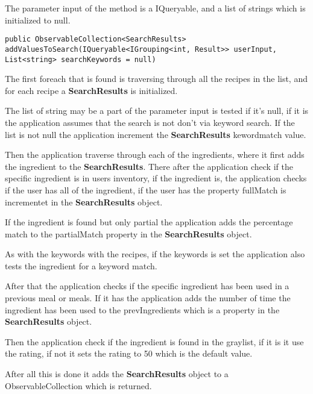 The parameter input of the method is a IQueryable, and a list of strings which is initialized to null.

\begin{lstlisting}[caption=addValuesToSearch, label={lst:addValuesToSearch}, language=CSharp]
        public ObservableCollection<SearchResults> addValuesToSearch(IQueryable<IGrouping<int, Result>> userInput, List<string> searchKeywords = null)
\end{lstlisting}

The first foreach that is found is traversing through all the recipes in the list, and for each recipe a \textbf{SearchResults} is initialized.

The list of string may be a part of the parameter input is tested if it's null, if it is the application assumes that the search is not don’t via keyword search. If the list is not null the application increment the \textbf{SearchResults} kewordmatch value.

Then the application traverse through each of the ingredients, where it first adds the ingredient to the \textbf{SearchResults}. There after the application check if the specific ingredient is in users inventory, if the ingredient is, the application checks if the user has all of the ingredient, if the user has the property fullMatch is incrementet in the \textbf{SearchResults} object.

If the ingredient is found but only partial the application adds the percentage match to the partialMatch property in the \textbf{SearchResults} object.

As with the keywords with the recipes, if the keywords is set the application also tests the ingredient for a keyword match.

After that the application checks if the specific ingredient has been used in a previous meal or meals.
If it has the application adds the number of time the ingredient has been used to the prevIngredients which is a property in the \textbf{SearchResults} object.

Then the application check if the ingredient is found in the graylist, if it is it use the rating, if not it sets the rating to 50 which is the default value.

After all this is done it adds the \textbf{SearchResults} object to a ObservableCollection which is returned.